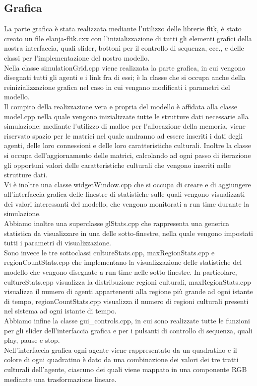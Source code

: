\documentclass[a4paper,12pt]{article}
\begin{document}
\subsection{Grafica}
La parte grafica \`e stata realizzata mediante l'utilizzo delle librerie fltk, \`e stato creato un file elanja-fltk.cxx con l'inizializzazione di tutti 
gli elementi grafici della nostra interfaccia, quali slider, bottoni per il controllo di sequenza, ecc., e delle classi per l'implementazione
del  nostro modello.\\
Nella classe simulationGrid.cpp viene realizzata la parte grafica, in cui vengono disegnati tutti gli agenti e i link fra di essi;
\`e la classe che si occupa anche della reinizializzazione grafica nel caso in cui vengano modificati i parametri del modello.\\
Il compito della realizzazione vera e propria del modello \`e affidata alla classe model.cpp nella quale vengono inizializzate tutte le strutture 
dati necessarie alla simulazione: mediante l'utilizzo di malloc per l'allocazione della memoria, viene riservato spazio per le matrici nel quale 
andranno ad essere inseriti i dati degli agenti, delle loro connessioni e delle loro caratteristiche culturali. Inoltre la classe si occupa dell'aggiornamento delle matrici, calcolando ad 
ogni passo di iterazione gli opportuni valori delle caratteristiche culturali che vengono inseriti nelle strutture dati.\\
Vi \`e inoltre una classe widgetWindow.cpp che si occupa di creare e di aggiungere all'interfaccia grafica delle finestre di statistiche sulle
quali vengono visualizzati dei valori interessanti del modello, che vengono monitorati a run time durante la simulazione.\\
Abbiamo inoltre una superclasse glStats.cpp che rappresenta una generica statistica da visualizzare in una delle sotto-finestre, nella quale 
vengono impostati tutti i parametri di visualizzazione.\\
Sono invece le tre sottoclassi cultureStats.cpp, maxRegionStats.cpp e regionCountStats.cpp che implementano la visualizzazione delle statistiche del
modello che vengono disegnate a run time nelle sotto-finestre. 
In particolare, cultureStats.cpp visualizza la distribuzione regioni culturali, maxRegionStats.cpp visualizza il numero di agenti appartenenti alla regione pi\`{u} grande ad ogni istante di tempo, regionCountStats.cpp visualizza il numero di regioni culturali presenti nel sistema ad ogni istante di tempo.\\
Abbiamo infine la classe gui\_controls.cpp, in cui sono realizzate tutte le funzioni per gli slider dell'interfaccia grafica e per i pulsanti di 
controllo  di sequenza, quali play, pause e stop.\\
Nell'interfaccia grafica ogni agente viene rappresentato da un quadratino e il colore di ogni quadratino \`{e} dato da una 
combinazione dei valori dei tre tratti culturali dell'agente, ciascuno dei quali viene mappato in una componente RGB mediante una trasformazione lineare.
\end{document}
